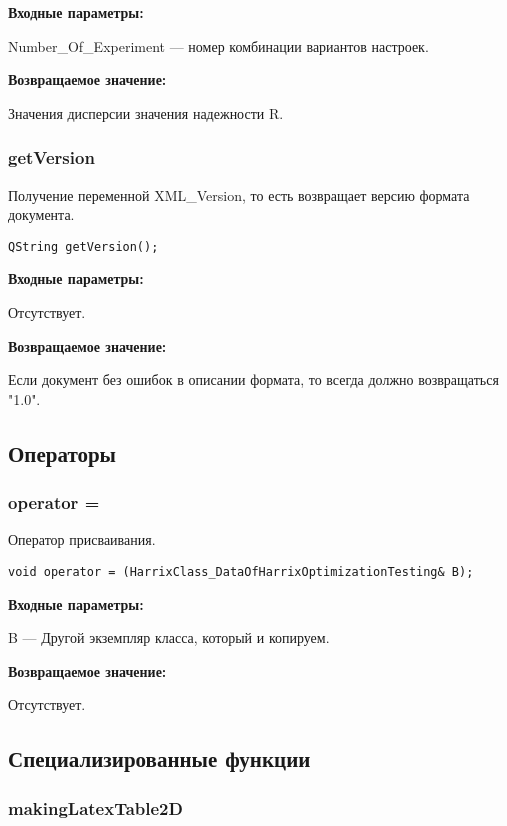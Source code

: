 \textbf{Входные параметры:}

Number\_Of\_Experiment --- номер комбинации вариантов настроек.

\textbf{Возвращаемое значение:}

Значения дисперсии значения надежности R.


\subsubsection{getVersion}\label{getVersion}

Получение переменной XML\_Version, то есть возвращает версию формата документа.


\begin{lstlisting}[label=code_syntax_getVersion,caption=Синтаксис]
QString getVersion();
\end{lstlisting}

\textbf{Входные параметры:}

Отсутствует.

\textbf{Возвращаемое значение:}

Если документ без ошибок в описании формата, то всегда должно возвращаться "1.0".


\subsection{Операторы}

\subsubsection{operator =}\label{operator =}

Оператор присваивания.


\begin{lstlisting}[label=code_syntax_operator =,caption=Синтаксис]
void operator = (HarrixClass_DataOfHarrixOptimizationTesting& B);
\end{lstlisting}

\textbf{Входные параметры:}

B --- Другой экземпляр класса, который и копируем.

\textbf{Возвращаемое значение:}

Отсутствует.


\subsection{Специализированные функции}

\subsubsection{makingLatexTable2D}\label{makingLatexTable2D}

